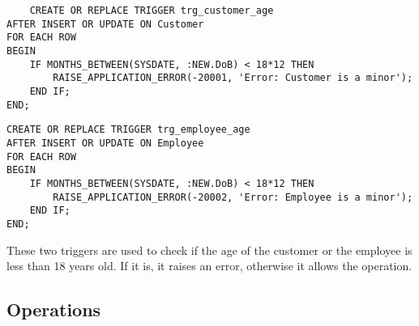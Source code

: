 \begin{lstlisting}
    CREATE OR REPLACE TRIGGER trg_customer_age
AFTER INSERT OR UPDATE ON Customer
FOR EACH ROW
BEGIN
    IF MONTHS_BETWEEN(SYSDATE, :NEW.DoB) < 18*12 THEN
        RAISE_APPLICATION_ERROR(-20001, 'Error: Customer is a minor');
    END IF;
END;
\end{lstlisting}

\begin{lstlisting}
CREATE OR REPLACE TRIGGER trg_employee_age
AFTER INSERT OR UPDATE ON Employee
FOR EACH ROW
BEGIN
    IF MONTHS_BETWEEN(SYSDATE, :NEW.DoB) < 18*12 THEN
        RAISE_APPLICATION_ERROR(-20002, 'Error: Employee is a minor');
    END IF;
END;
\end{lstlisting}

These two triggers are used to check if the age of the customer or the employee is less than 18 years old. If it is, it raises an error, otherwise it allows the operation.


\subsection{Operations}

